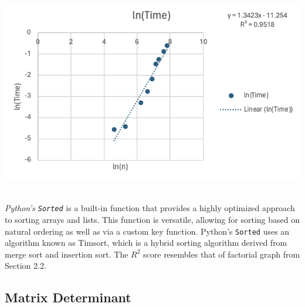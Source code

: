 \documentclass{article}
\begin{document}
\begin{minipage}{0.6\textwidth} %

    

    \centering
    \includegraphics[width=1\linewidth]{Graphs/Python.png} %

     
    
\end{minipage}\\

    \textit{Python's \texttt{Sorted}} is a built-in function that provides a highly optimized approach to sorting arrays and lists. This function is versatile, allowing for sorting based on natural ordering as well as via a custom key function. Python's \texttt{Sorted} uses an algorithm known as Timsort, which is a hybrid sorting algorithm derived from merge sort and insertion sort. The $R^2$ score resembles that of factorial graph from Section 2.2.

    \subsection{Matrix Determinant}

    
\end{document}
